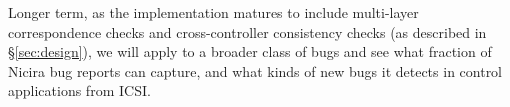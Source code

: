         Longer term, as the \projectname{} implementation matures to include multi-layer correspondence checks and cross-controller consistency checks (as described in \S\ref{sec:design}), we will apply \projectname{} to a broader class of bugs and see what fraction of Nicira bug reports \projectname{} can capture, and what kinds of new bugs it detects in control applications from ICSI. 



